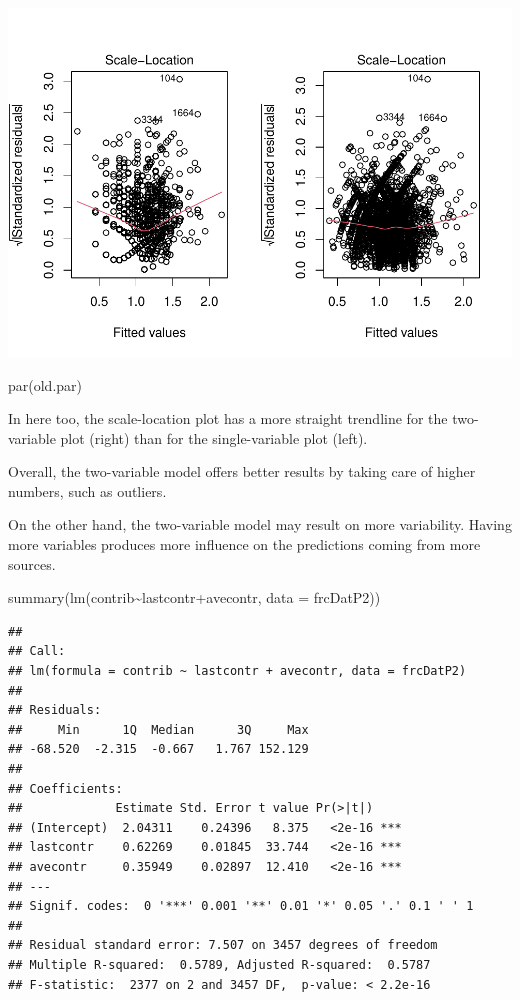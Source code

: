 \documentclass[
]{article}
\newenvironment{Shaded}{\begin{snugshade}}{\end{snugshade}}
\newcommand{\AttributeTok}[1]{\textcolor[rgb]{0.77,0.63,0.00}{#1}}
\newcommand{\FunctionTok}[1]{\textcolor[rgb]{0.00,0.00,0.00}{#1}}
\newcommand{\NormalTok}[1]{#1}
\newcommand{\SpecialCharTok}[1]{\textcolor[rgb]{0.00,0.00,0.00}{#1}}
\begin{document}
\includegraphics{linear_regression__uc_files/figure-latex/Problem4_Q4.2-1.pdf}

\begin{Shaded}
\begin{Highlighting}[]
\FunctionTok{par}\NormalTok{(old.par)}
\end{Highlighting}
\end{Shaded}

In here too, the scale-location plot has a more straight trendline for
the two-variable plot (right) than for the single-variable plot (left).

Overall, the two-variable model offers better results by taking care of
higher numbers, such as outliers.

On the other hand, the two-variable model may result on more
variability. Having more variables produces more influence on the
predictions coming from more sources.

\begin{Shaded}
\begin{Highlighting}[]
\FunctionTok{summary}\NormalTok{(}\FunctionTok{lm}\NormalTok{(contrib}\SpecialCharTok{\textasciitilde{}}\NormalTok{lastcontr}\SpecialCharTok{+}\NormalTok{avecontr, }\AttributeTok{data =}\NormalTok{ frcDatP2))}
\end{Highlighting}
\end{Shaded}

\begin{verbatim}
## 
## Call:
## lm(formula = contrib ~ lastcontr + avecontr, data = frcDatP2)
## 
## Residuals:
##     Min      1Q  Median      3Q     Max 
## -68.520  -2.315  -0.667   1.767 152.129 
## 
## Coefficients:
##             Estimate Std. Error t value Pr(>|t|)    
## (Intercept)  2.04311    0.24396   8.375   <2e-16 ***
## lastcontr    0.62269    0.01845  33.744   <2e-16 ***
## avecontr     0.35949    0.02897  12.410   <2e-16 ***
## ---
## Signif. codes:  0 '***' 0.001 '**' 0.01 '*' 0.05 '.' 0.1 ' ' 1
## 
## Residual standard error: 7.507 on 3457 degrees of freedom
## Multiple R-squared:  0.5789, Adjusted R-squared:  0.5787 
## F-statistic:  2377 on 2 and 3457 DF,  p-value: < 2.2e-16
\end{verbatim}
\end{document}
